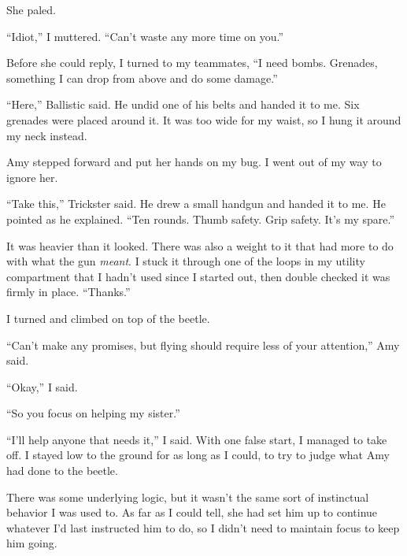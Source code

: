 She paled.



``Idiot,'' I muttered.  ``Can't waste any more time on you.''



Before she could reply, I turned to my teammates, ``I need bombs.  Grenades, something I can drop from above and do some damage.''



``Here,'' Ballistic said.  He undid one of his belts and handed it to me.  Six grenades were placed around it.  It was too wide for my waist, so I hung it around my neck instead.



Amy stepped forward and put her hands on my bug.  I went out of my way to ignore her.



``Take this,'' Trickster said.  He drew a small handgun and handed it to me.  He pointed as he explained.  ``Ten rounds.  Thumb safety.  Grip safety.  It's my spare.''



It was heavier than it looked.  There was also a weight to it that had more to do with what the gun \emph{meant}.  I stuck it through one of the loops in my utility compartment that I hadn't used since I started out, then double checked it was firmly in place.  ``Thanks.''



I turned and climbed on top of the beetle.



``Can't make any promises, but flying should require less of your attention,'' Amy said.



``Okay,'' I said.



``So you focus on helping my sister.''



``I'll help anyone that needs it,'' I said.  With one false start, I managed to take off.  I stayed low to the ground for as long as I could, to try to judge what Amy had done to the beetle.



There was some underlying logic, but it wasn't the same sort of instinctual behavior I was used to.  As far as I could tell, she had set him up to continue whatever I'd last instructed him to do, so I didn't need to maintain focus to keep him going.



